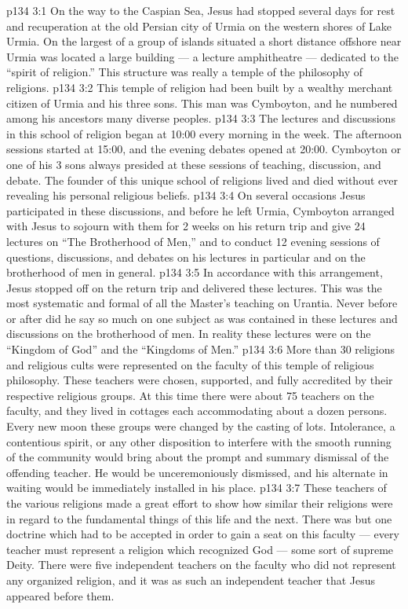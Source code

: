 \vs p134 3:1 On the way to the Caspian Sea, Jesus had stopped several days for rest and recuperation at the old Persian city of Urmia on the western shores of Lake Urmia. On the largest of a group of islands situated a short distance offshore near Urmia was located a large building --- a lecture amphitheatre --- dedicated to the “spirit of religion.” This structure was really a temple of the philosophy of religions.
\vs p134 3:2 This temple of religion had been built by a wealthy merchant citizen of Urmia and his three sons. This man was Cymboyton, and he numbered among his ancestors many diverse peoples.
\vs p134 3:3 The lectures and discussions in this school of religion began at 10:00 every morning in the week. The afternoon sessions started at 15:00, and the evening debates opened at 20:00. Cymboyton or one of his 3 sons always presided at these sessions of teaching, discussion, and debate. The founder of this unique school of religions lived and died without ever revealing his personal religious beliefs.
\vs p134 3:4 On several occasions Jesus participated in these discussions, and before he left Urmia, Cymboyton arranged with Jesus to sojourn with them for 2 weeks on his return trip and give 24 lectures on “The Brotherhood of Men,” and to conduct 12 evening sessions of questions, discussions, and debates on his lectures in particular and on the brotherhood of men in general.
\vs p134 3:5 In accordance with this arrangement, Jesus stopped off on the return trip and delivered these lectures. This was the most systematic and formal of all the Master’s teaching on Urantia. Never before or after did he say so much on one subject as was contained in these lectures and discussions on the brotherhood of men. In reality these lectures were on the “Kingdom of God” and the “Kingdoms of Men.”
\vs p134 3:6 More than 30 religions and religious cults were represented on the faculty of this temple of religious philosophy. These teachers were chosen, supported, and fully accredited by their respective religious groups. At this time there were about 75 teachers on the faculty, and they lived in cottages each accommodating about a dozen persons. Every new moon these groups were changed by the casting of lots. Intolerance, a contentious spirit, or any other disposition to interfere with the smooth running of the community would bring about the prompt and summary dismissal of the offending teacher. He would be unceremoniously dismissed, and his alternate in waiting would be immediately installed in his place.
\vs p134 3:7 These teachers of the various religions made a great effort to show how similar their religions were in regard to the fundamental things of this life and the next. There was but one doctrine which had to be accepted in order to gain a seat on this faculty --- every teacher must represent a religion which recognized God --- some sort of supreme Deity. There were five independent teachers on the faculty who did not represent any organized religion, and it was as such an independent teacher that Jesus appeared before them.
